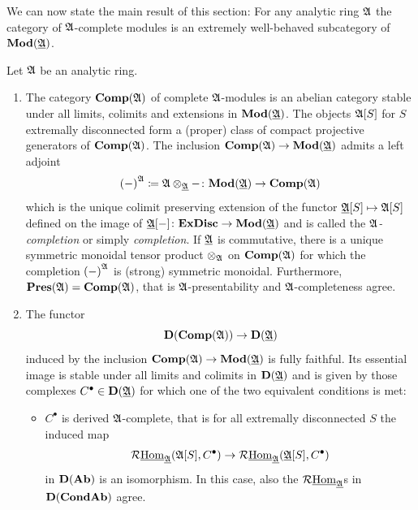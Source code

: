 We can now state the main result of this section: For any analytic ring ${\mathfrak{A}}$ the category of ${\mathfrak{A}}$-complete modules is an extremely well-behaved subcategory of ${{\mathbf{Mod}}({\underline{{\mathfrak{A}}}})}$.
\begin{theorem}
	\label{theorem: properties of the category of complete modules} 
	
	Let ${\mathfrak{A}}$ be an analytic ring.
	\begin{enumerate}
		\item
		The category ${{\mathbf{Comp}}({\mathfrak{A}})}$ of complete ${\mathfrak{A}}$-modules is an abelian category stable under all limits, colimits and extensions in ${{\mathbf{Mod}}({\underline{{\mathfrak{A}}}})}$. The objects ${{{\mathfrak{A}}[S]}}$ for $S$ extremally disconnected form a (proper) class of compact projective generators of ${{\mathbf{Comp}}({\mathfrak{A}})}$. The inclusion ${{\mathbf{Comp}}({\mathfrak{A}})} \to {{\mathbf{Mod}}({\underline{{\mathfrak{A}}}})}$ admits a left adjoint
			$$\completion{-}{\preAnaRing{A}}\ldef \completionAsTensor{\preAnaRing{A}}{\underlying{A}}{-}\colon\mod{\underlying{A}} \to \pCompleteMod{A}$$
		which is the unique colimit preserving extension of the functor ${{{\underline{{\mathfrak{A}}}}[S]}} \mapsto {{{\mathfrak{A}}[S]}}$ defined on the image of ${{{\underline{{\mathfrak{A}}}}[-]}}\colon {\mathbf{ExDisc}}\to {{\mathbf{Mod}}({\underline{{\mathfrak{A}}}})}$ and is called the \emph{${\mathfrak{A}}$-completion} or simply \emph{completion}. If ${\underline{{\mathfrak{A}}}}$ is commutative, there is a unique symmetric monoidal tensor product $\otimes_{\mathfrak{A}}$ on ${{\mathbf{Comp}}({\mathfrak{A}})}$ for which the completion $\completion{-}{\preAnaRing{A}}$ is (strong) symmetric monoidal. Furthermore, ${{\mathbf{Pres}}({\mathfrak{A}})}={{\mathbf{Comp}}({\mathfrak{A}})}$, that is ${\mathfrak{A}}$-presentability and  ${\mathfrak{A}}$-completeness agree.
		
		\item
		The functor
			$${{\mathbf{D}}({{\mathbf{Comp}}({\mathfrak{A}})})} \to {{\mathbf{D}}({\underline{{\mathfrak{A}}}})}$$
		induced by the inclusion ${{\mathbf{Comp}}({\mathfrak{A}})} \to {{\mathbf{Mod}}({\underline{{\mathfrak{A}}}})}$ is fully faithful. Its essential image is stable under all limits and colimits in ${{\mathbf{D}}({\underline{{\mathfrak{A}}}})}$ and is given by those complexes $C^\bullet \in {{\mathbf{D}}({\underline{{\mathfrak{A}}}})}$ for which one of the two equivalent conditions is met:
		\begin{itemize}
			\item
			$C^\bullet$ is derived ${\mathfrak{A}}$-complete, that is for all extremally disconnected $S$ the induced map
				$$\mathcal{R}{\underline{\operatorname{Hom}}}_{{\underline{{\mathfrak{A}}}}}({{{\mathfrak{A}}[S]}}, C^\bullet) \to \mathcal{R}{\underline{\operatorname{Hom}}}_{{\underline{{\mathfrak{A}}}}}({{{\underline{{\mathfrak{A}}}}[S]}}, C^\bullet)$$
			in ${{\mathbf{D}}({{\mathbf{Ab}}})}$ is an isomorphism. In this case, also the $\mathcal{R}{\underline{\operatorname{Hom}}}_{{\underline{{\mathfrak{A}}}}}$s in ${{\mathbf{D}}({{{\mathbf{Cond}}}{{\mathbf{Ab}}}})}$ agree.
			

\end{itemize}
\end{enumerate}
\end{theorem}

